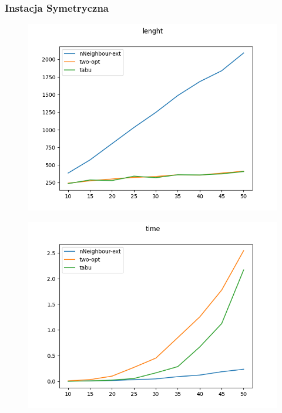 \documentclass[11pt]{article}
\begin{document}
    \subsubsection{Instacja Symetryczna}
    \begin{center}
        \begin{figure}[H]
            \includegraphics[scale=0.50]{symetricLen.png}
        \end{figure}
    \end{center}
    \begin{center}
        \begin{figure}[H]
            \includegraphics[scale=0.50]{symetricTime.png}\\
        \end{figure}
    \end{center}
        
\end{document}
